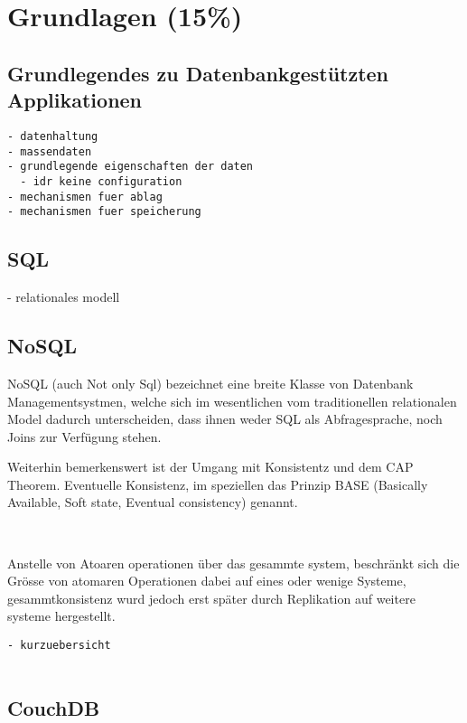 \chapter{Grundlagen (15\%)}

\section{Grundlegendes zu Datenbankgest\"utzten Applikationen}

\begin{verbatim}
- datenhaltung
- massendaten
- grundlegende eigenschaften der daten
  - idr keine configuration
- mechanismen fuer ablag
- mechanismen fuer speicherung
\end{verbatim}


\section{SQL}

- relationales modell

\section{NoSQL}

NoSQL (auch Not only Sql) bezeichnet eine breite Klasse
von Datenbank Managementsystmen, welche sich im wesentlichen
vom traditionellen relationalen Model dadurch unterscheiden,
dass ihnen weder SQL als Abfragesprache, noch Joins zur Verfügung stehen.
~ \cite{wikipedia:nosql}



Weiterhin bemerkenswert ist der Umgang mit Konsistentz und dem CAP Theorem.
Eventuelle Konsistenz, im speziellen das Prinzip BASE (Basically Available, Soft state, Eventual consistency) genannt.

~ \cite{wikipedia:base}

Anstelle von Atoaren operationen über das gesammte system,
beschränkt sich die Grösse von atomaren Operationen dabei auf eines 
oder wenige Systeme, gesammtkonsistenz wurd jedoch erst später durch Replikation auf weitere systeme hergestellt.


\begin{verbatim}
- kurzuebersicht


\end{verbatim}



\section{CouchDB}


